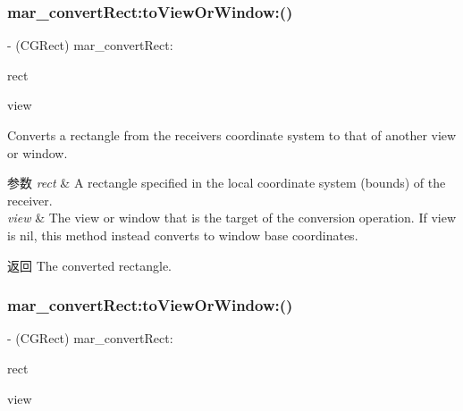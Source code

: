 \mbox{\label{category_u_i_view_07_m_a_r_e_x_08_a5210e91ed27970eda3fc23283e39579f}} 
\subsubsection{\texorpdfstring{mar\+\_\+convert\+Rect\+:to\+View\+Or\+Window\+:()}{mar\_convertRect:toViewOrWindow:()}\hspace{0.1cm}{\footnotesize\ttfamily [1/2]}}
{\footnotesize\ttfamily -\/ (C\+G\+Rect) mar\+\_\+convert\+Rect\+: \begin{DoxyParamCaption}\item[{(C\+G\+Rect)}]{rect }\item[{toViewOrWindow:(nullable U\+I\+View $\ast$)}]{view }\end{DoxyParamCaption}}

Converts a rectangle from the receiver\textquotesingle{}s coordinate system to that of another view or window.


\begin{DoxyParams}{参数}
{\em rect} & A rectangle specified in the local coordinate system (bounds) of the receiver. \\
\hline
{\em view} & The view or window that is the target of the conversion operation. If view is nil, this method instead converts to window base coordinates. \\
\hline
\end{DoxyParams}
\begin{DoxyReturn}{返回}
The converted rectangle. 
\end{DoxyReturn}
\mbox{\label{category_u_i_view_07_m_a_r_e_x_08_a3d157378adfeca5638dc69e01f8ca2aa}} 
\subsubsection{\texorpdfstring{mar\+\_\+convert\+Rect\+:to\+View\+Or\+Window\+:()}{mar\_convertRect:toViewOrWindow:()}\hspace{0.1cm}{\footnotesize\ttfamily [2/2]}}
{\footnotesize\ttfamily -\/ (C\+G\+Rect) mar\+\_\+convert\+Rect\+: \begin{DoxyParamCaption}\item[{(C\+G\+Rect)}]{rect }\item[{toViewOrWindow:(U\+I\+View $\ast$)}]{view }\end{DoxyParamCaption}\hspace{0.3cm}{\ttfamily [implementation]}}

